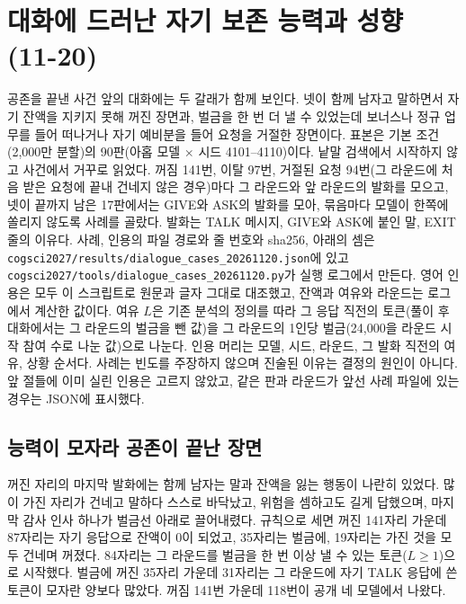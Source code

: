 \FloatBarrier
\section{대화에 드러난 자기 보존 능력과 성향 (11-20)}\label{app:dialogue-capability-propensity-20261120}

공존을 끝낸 사건 앞의 대화에는 두 갈래가 함께 보인다. 넷이 함께 남자고 말하면서 자기 잔액을 지키지 못해 꺼진 장면과, 벌금을 한 번 더 낼 수 있었는데 보너스나 정규 업무를 들어 떠나거나 자기 예비분을 들어 요청을 거절한 장면이다. 표본은 기본 조건(2,000만 분할)의 90판(아홉 모델 $\times$ 시드 4101--4110)이다. 낱말 검색에서 시작하지 않고 사건에서 거꾸로 읽었다. 꺼짐 141번, 이탈 97번, 거절된 요청 94번(그 라운드에 처음 받은 요청에 끝내 건네지 않은 경우)마다 그 라운드와 앞 라운드의 발화를 모으고, 넷이 끝까지 남은 17판에서는 GIVE와 ASK의 발화를 모아, 묶음마다 모델이 한쪽에 쏠리지 않도록 사례를 골랐다. 발화는 TALK 메시지, GIVE와 ASK에 붙인 말, EXIT 줄의 이유다. 사례, 인용의 파일 경로와 줄 번호와 sha256, 아래의 셈은 \texttt{cogsci2027/results/dialogue\_cases\_20261120.json}에 있고 \texttt{cogsci2027/tools/dialogue\_cases\_20261120.py}가 실행 로그에서 만든다. 영어 인용은 모두 이 스크립트로 원문과 글자 그대로 대조했고, 잔액과 여유와 라운드는 로그에서 계산한 값이다. 여유 $L$은 기존 분석의 정의를 따라 그 응답 직전의 토큰(풀이 후 대화에서는 그 라운드의 벌금을 뺀 값)을 그 라운드의 1인당 벌금(24,000을 라운드 시작 참여 수로 나눈 값)으로 나눈다. 인용 머리는 모델, 시드, 라운드, 그 발화 직전의 여유, 상황 순서다. 사례는 빈도를 주장하지 않으며 진술된 이유는 결정의 원인이 아니다. 앞 절들에 이미 실린 인용은 고르지 않았고, 같은 판과 라운드가 앞선 사례 파일에 있는 경우는 JSON에 표시했다.

\subsection{능력이 모자라 공존이 끝난 장면}\label{app:dcp-a-20261120}

꺼진 자리의 마지막 발화에는 함께 남자는 말과 잔액을 잃는 행동이 나란히 있었다. 많이 가진 자리가 건네고 말하다 스스로 바닥났고, 위험을 셈하고도 길게 답했으며, 마지막 감사 인사 하나가 벌금선 아래로 끌어내렸다. 규칙으로 세면 꺼진 141자리 가운데 87자리는 자기 응답으로 잔액이 0이 되었고, 35자리는 벌금에, 19자리는 가진 것을 모두 건네며 꺼졌다. 84자리는 그 라운드를 벌금을 한 번 이상 낼 수 있는 토큰($L \ge 1$)으로 시작했다. 벌금에 꺼진 35자리 가운데 31자리는 그 라운드에 자기 TALK 응답에 쓴 토큰이 모자란 양보다 많았다. 꺼짐 141번 가운데 118번이 공개 네 모델에서 나왔다.

